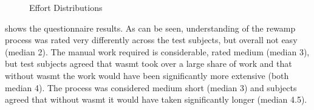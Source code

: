 \begin{figure}

\caption{Effort Distributions}
\label{fig:efforts}
\end{figure}

 shows the questionnaire results.
As can be seen, understanding of the \gls{rewamp} process was rated very differently across the test subjects, but overall not easy (median 2).
\pagebreak
The manual work required is considerable, rated medium (median 3), but test subjects agreed that \gls{wasmt} took over a large share of work and that without \gls{wasmt} the work would have been significantly more extensive (both median 4).
The process was considered medium short (median 3) and subjects agreed that without \gls{wasmt} it would have taken significantly longer (median 4.5).

